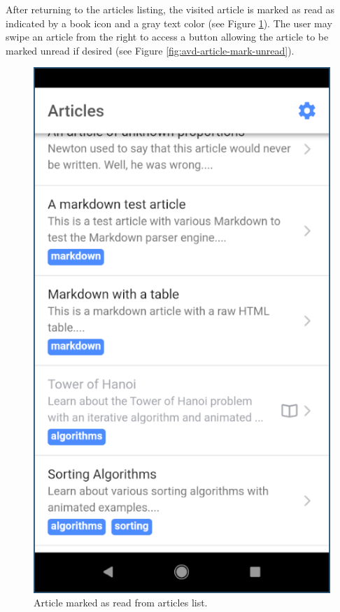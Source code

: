 \documentclass[12pt]{report}
\begin{document}
After returning to the articles listing, the visited article is marked as read
as indicated by a book icon and a gray text color (see Figure
\ref{fig:avd-article-read}). The user may swipe an article from the right to
access a button allowing the article to be marked unread if desired (see Figure
\ref{fig:avd-article-mark-unread}).

\begin{figure}
    \centering
    \includegraphics[scale=0.5]{images/avd-article-read.png}
    \caption{Article marked as read from articles list.}
    \label{fig:avd-article-read}
\end{figure}
\end{document}
